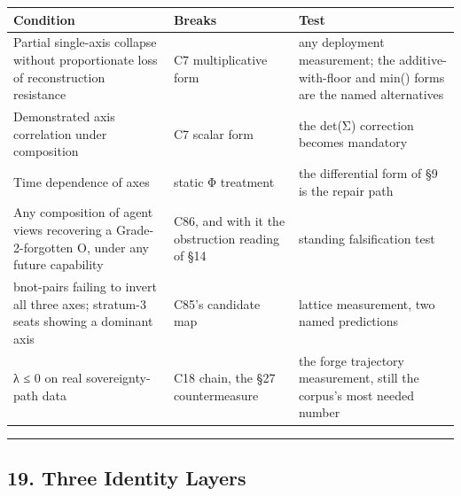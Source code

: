 \documentclass[
  11pt,
]{article}
\newcounter{none} %
\begin{document}
{\def\LTcaptype{none} %
\begin{longtable}[]{@{}
  >{\raggedright\arraybackslash}p{}
  >{\raggedright\arraybackslash}p{}
  >{\raggedright\arraybackslash}p{}@{}}
\toprule\noalign{}
\begin{minipage}[b]{\linewidth}\raggedright
Condition
\end{minipage} & \begin{minipage}[b]{\linewidth}\raggedright
Breaks
\end{minipage} & \begin{minipage}[b]{\linewidth}\raggedright
Test
\end{minipage} \\
\midrule\noalign{}
\endhead
\bottomrule\noalign{}
\endlastfoot
Partial single-axis collapse without proportionate loss of
reconstruction resistance & C7 multiplicative form & any deployment
measurement; the additive-with-floor and min() forms are the named
alternatives \\
Demonstrated axis correlation under composition & C7 scalar form & the
det(Σ) correction becomes mandatory \\
Time dependence of axes & static Φ treatment & the differential form of
§9 is the repair path \\
Any composition of agent views recovering a Grade-2-forgotten O, under
any future capability & C86, and with it the obstruction reading of §14
& standing falsification test \\
bnot-pairs failing to invert all three axes; stratum-3 seats showing a
dominant axis & C85's candidate map & lattice measurement, two named
predictions \\
λ ≤ 0 on real sovereignty-path data & C18 chain, the §27 countermeasure
& the forge trajectory measurement, still the corpus's most needed
number \\
\end{longtable}
}

\begin{center}\rule{0.5\linewidth}{0.5pt}\end{center}

\subsection{19. Three Identity Layers}\label{three-identity-layers}
\end{document}
